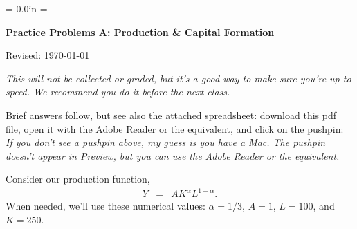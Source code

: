\documentclass[12pt]{exam}
\def\HeadName{Practice Problems A}
\begin{document}
\parindent = 0.0in
\parskip = \bigskipamount
\thispagestyle{empty}%
\Head

\centerline{\large \bf \HeadName: Production \& Capital Formation}
\centerline{Revised:  \today}

\medskip
{\it This will not be collected or graded,
but it's a good way to make sure you're up to speed.
We recommend you do it before the next class.}

\begin{questions}

\begin{solution}
Brief answers follow,
but see also the attached spreadsheet:
download this pdf file, open it with the Adobe Reader or the equivalent,
and click on the pushpin:
 \\
{\it If you don't see a pushpin above, my guess is you have a Mac.
The pushpin doesn't appear in Preview,
but you can use the Adobe Reader or the equivalent.}
\end{solution}

Consider our production function,
\begin{eqnarray*}
    Y &=& A K^\alpha L^{1-\alpha} .
\end{eqnarray*}
When needed, we'll use these numerical values:
$\alpha = 1/3$, $A=1$, $L=100$, and $K=250$.

\end{questions}
\end{document}
